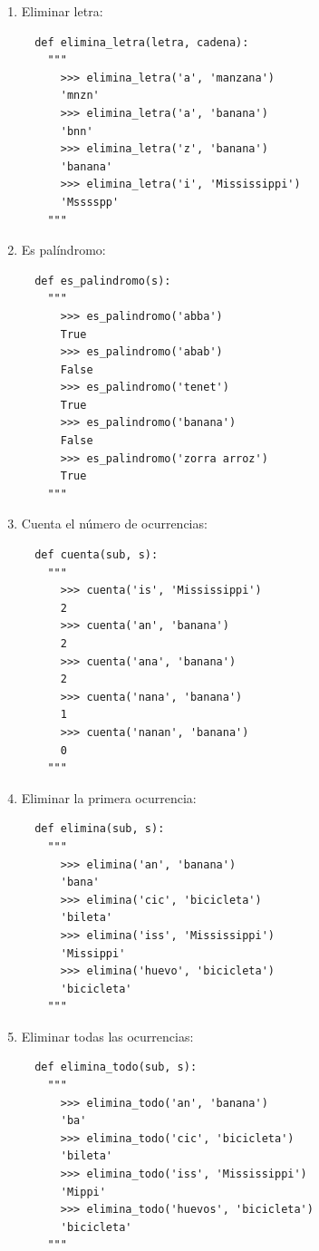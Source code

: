 \begin{enumerate}
  \item Eliminar letra:
  
  \beforeverb
  \begin{verbatim}
  def elimina_letra(letra, cadena):
    """
      >>> elimina_letra('a', 'manzana')
      'mnzn'
      >>> elimina_letra('a', 'banana')
      'bnn'
      >>> elimina_letra('z', 'banana')
      'banana'
      >>> elimina_letra('i', 'Mississippi')
      'Msssspp'
    """
  \end{verbatim}
  \afterverb
  
  \item Es palíndromo:
  
  \beforeverb
  \begin{verbatim}
  def es_palindromo(s):
    """
      >>> es_palindromo('abba')
      True
      >>> es_palindromo('abab')
      False
      >>> es_palindromo('tenet')
      True
      >>> es_palindromo('banana')
      False
      >>> es_palindromo('zorra arroz')
      True
    """
  \end{verbatim}
  \afterverb
  
  \item Cuenta el número de ocurrencias:
  
  \beforeverb
  \begin{verbatim}
  def cuenta(sub, s):
    """
      >>> cuenta('is', 'Mississippi')
      2
      >>> cuenta('an', 'banana')
      2
      >>> cuenta('ana', 'banana')
      2
      >>> cuenta('nana', 'banana')
      1
      >>> cuenta('nanan', 'banana')
      0
    """
  \end{verbatim}
  \afterverb
  
  \item Eliminar la primera ocurrencia:
  
  \beforeverb
  \begin{verbatim}
  def elimina(sub, s):
    """
      >>> elimina('an', 'banana')
      'bana'
      >>> elimina('cic', 'bicicleta')
      'bileta'
      >>> elimina('iss', 'Mississippi')
      'Missippi'
      >>> elimina('huevo', 'bicicleta')
      'bicicleta'
    """
  \end{verbatim}
  \afterverb
  
  \item Eliminar todas las ocurrencias:
  
  \beforeverb
  \begin{verbatim}
  def elimina_todo(sub, s):
    """
      >>> elimina_todo('an', 'banana')
      'ba'
      >>> elimina_todo('cic', 'bicicleta')
      'bileta'
      >>> elimina_todo('iss', 'Mississippi')
      'Mippi'
      >>> elimina_todo('huevos', 'bicicleta')
      'bicicleta'
    """
  \end{verbatim}
  \afterverb
 
\end{enumerate}
